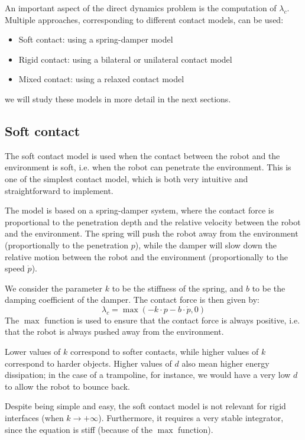 An important aspect of the direct dynamics problem is the computation of $\lambda_c$. Multiple approaches, corresponding to different contact models, can be used:
\begin{itemize}
    \item Soft contact: using a spring-damper model
    \item Rigid contact: using a bilateral or unilateral contact model
    \item Mixed contact: using a relaxed contact model
\end{itemize}
we will study these models in more detail in the next sections.

\subsection{Soft contact}
The soft contact model is used when the contact between the robot and the environment is soft, i.e. when the robot can penetrate the environment. This is one of the simplest contact model, which is both very intuitive and straightforward to implement. 

The model is based on a spring-damper system, where the contact force is proportional to the penetration depth and the relative velocity between the robot and the environment. The spring will push the robot away from the environment (proportionally to the penetration $p$), while the damper will slow down the relative motion between the robot and the environment (proportionally to the speed $\dot{p}$).

We consider the parameter $k$ to be the stiffness of the spring, and $b$ to be the damping coefficient of the damper. The contact force is then given by:
\begin{equation}
    \lambda_c = \max(-k\cdot p - b\cdot\dot{p}, 0)
\end{equation}
The $\max$ function is used to ensure that the contact force is always positive, i.e. that the robot is always pushed away from the environment.

Lower values of $k$ correspond to softer contacts, while higher values of $k$ correspond to harder objects. Higher values of $d$ also mean higher energy dissipation; in the case of a trampoline, for instance, we would have a very low $d$ to allow the robot to bounce back.

Despite being simple and easy, the soft contact model is not relevant for rigid interfaces (when $k\to+\infty$). Furthermore, it requires a very stable integrator, since the equation is stiff (because of the $\max$ function).

